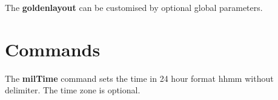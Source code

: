 \documentclass[a4paper,10pt]{scrarticle}
\begin{document}
The \textbf{goldenlayout} can be customised by optional global parameters.

\noindent{} 

\noindent{}

\noindent{}


\section{Commands}

\noindent{} The \textbf{milTime} command sets the time in 24 hour format hhmm without delimiter. The time zone is optional.
\end{document}

